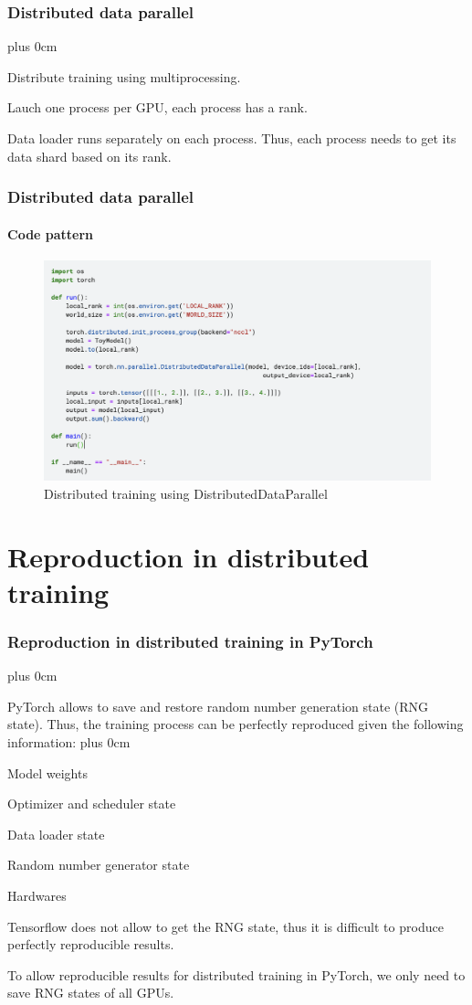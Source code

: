 \documentclass[11pt]{beamer}
\renewcommand{\raggedright}{\leftskip=0pt \rightskip=0pt plus 0cm}
\let\olditemize=\itemize
\renewenvironment{itemize}{\olditemize\raggedright}{\endlist}
\begin{document}
\begin{frame}
\frametitle{Distributed data parallel}
\begin{itemize}
	\item Distribute training using multiprocessing.
	\item Lauch one process per GPU, each process has a rank.
	\item Data loader runs separately on each process. Thus, each process needs to get its data shard based on its rank.
\end{itemize}
\end{frame}
\begin{frame}
\frametitle{Distributed data parallel}
\framesubtitle{Code pattern}
\begin{figure}[!h]
\centering
\caption{Distributed training using DistributedDataParallel}
\includegraphics[scale=.3]{images/code/torch-ddp.png}
\end{figure}
\end{frame}
\section{Reproduction in distributed training}
\frame{\tableofcontents[currentsection]}
\begin{frame}
\frametitle{Reproduction in distributed training in PyTorch}
\begin{itemize}
	\item PyTorch allows to save and restore random number generation state (RNG state). Thus, the training process can be perfectly reproduced given the following information:
	\begin{itemize}
		\item Model weights
		\item Optimizer and scheduler state
		\item Data loader state
		\item Random number generator state
		\item Hardwares
	\end{itemize}
	\item Tensorflow does not allow to get the RNG state, thus it is difficult to produce perfectly reproducible results.
	\item To allow reproducible results for distributed training in PyTorch, we only need to save RNG states of all GPUs.
\end{itemize}
\end{frame}
\end{document}
